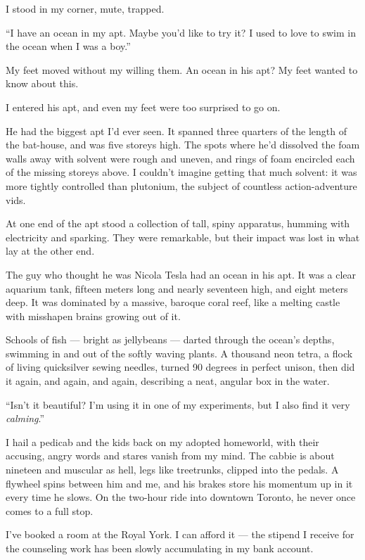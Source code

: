 I stood in my corner, mute, trapped.

``I have an ocean in my apt. Maybe you'd like to try it? I used to love to swim 
in the ocean when I was a boy.''

My feet moved without my willing them. An ocean in his apt? My feet
wanted to know about this.

I entered his apt, and even my feet were too surprised to go on.

He had the biggest apt I'd ever seen. It spanned three quarters of
the length of the bat-house, and was five storeys high. The spots
where he'd dissolved the foam walls away with solvent were rough
and uneven, and rings of foam encircled each of the missing storeys
above. I couldn't imagine getting that much solvent: it was more
tightly controlled than plutonium, the subject of countless
action-adventure vids.

At one end of the apt stood a collection of tall, spiny apparatus,
humming with electricity and sparking. They were remarkable, but
their impact was lost in what lay at the other end.

The guy who thought he was Nicola Tesla had an ocean in his apt. It
was a clear aquarium tank, fifteen meters long and nearly seventeen
high, and eight meters deep. It was dominated by a massive, baroque
coral reef, like a melting castle with misshapen brains growing out
of it.

Schools of fish --- bright as jellybeans --- darted through the
ocean's depths, swimming in and out of the softly waving plants. A
thousand neon tetra, a flock of living quicksilver sewing needles,
turned 90 degrees in perfect unison, then did it again, and again,
and again, describing a neat, angular box in the water.

``Isn't it beautiful? I'm using it in one of my experiments, but I also find it 
very \emph{calming}.''

\tb

I hail a pedicab and the kids back on my adopted homeworld, with
their accusing, angry words and stares vanish from my mind. The
cabbie is about nineteen and muscular as hell, legs like
treetrunks, clipped into the pedals. A flywheel spins between him
and me, and his brakes store his momentum up in it every time he
slows. On the two-hour ride into downtown Toronto, he never once
comes to a full stop.

I've booked a room at the Royal York. I can afford it --- the
stipend I receive for the counseling work has been slowly
accumulating in my bank account.

